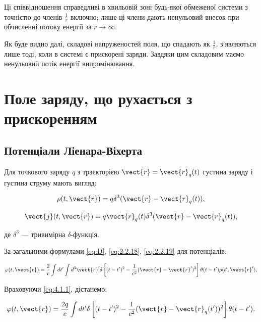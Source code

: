 Ці співвідношення справедливі в хвильовій зоні будь-якої обмеженої системи з точністю до членів \( \frac{1}{r} \) включно; лише ці члени дають
ненульовий внесок при обчисленні потоку енергії за \( r \to \infty \).

Як буде видно далі, складові напруженостей поля, що спадають як \( \frac{1}{r} \), з'являються лише тоді, коли в системі є прискорені заряди. Завдяки
цим складовим маємо ненульовий потік енергії випромінювання.

\section{Поле заряду, що рухається з прискоренням}

\subsection*{Потенціали Ліенара-Віхерта}

Для точкового заряду \( q \) з траєкторією \( \vect{r} = \vect{r}_q(t) \) густина заряду і густина струму мають вигляд:

\begin{equation}\label{eq:4.1.1}
	\rho(t, \vect{r}) = q \delta^3(\vect{r} - \vect{r}_q(t)),
\end{equation}

\begin{equation}
	\vect{j}(t, \vect{r}) = q \dot{\vect{r}}_q(t) \delta^3(\vect{r} - \vect{r}_q(t)),
	\label{eq:current_density}
\end{equation}

де \( \delta^3 \) --- тривимірна \( \delta \)-функція.


За загальними формулами \eqref{eq:D}, \eqref{eq:2.2.18}, \eqref{eq:2.2.19} для потенціалів:

\begin{equation}
	\varphi(t, \vect{r}) = \frac{2}{c} \int dt' \int d^3\vect{r}' \delta \left[ (t - t')^2 - \frac{1}{c^2} (\vect{r} - \vect{r}')^2 \right] \theta (t - t')
	\rho (t', \vect{r}'),
	\label{eq:general_potential}
\end{equation}

Враховуючи \eqref{eq:4.1.1}, дістанемо:

\begin{equation}
	\varphi(t, \vect{r}) = \frac{2q}{c} \int dt' \delta \left[ (t - t')^2 - \frac{1}{c^2} (\vect{r} - \vect{r}_q (t'))^2 \right] \theta (t - t').
	\label{eq:potential_with_delta}
\end{equation}

